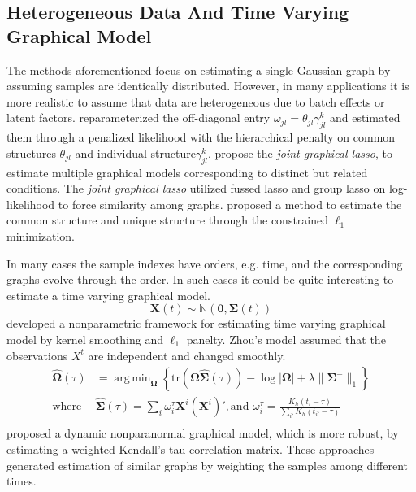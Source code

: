 \documentclass[11pt]{article}
\newcommand{\N}{\mathbb N}
\newcommand{\bX}{\mathbf X}
\newcommand{\bOmega}{{\boldsymbol{\Omega}}}
\newcommand{\bSigma}{{\boldsymbol{\Sigma}}}
\DeclareMathOperator*{\argmin}{arg\,min}
\begin{document}
 
\subsection{Heterogeneous Data And Time Varying Graphical Model}
The methods aforementioned focus on estimating a single Gaussian graph by assuming samples are identically distributed. However, in many applications it is more realistic to assume that data are heterogeneous due to batch effects or latent factors. \cite{guo2011joint} reparameterized the off-diagonal entry $\omega_{jl} = \theta_{jl} \gamma_{jl}^{k}$ and estimated them through a penalized likelihood with the hierarchical penalty on common structures $\theta_{jl}$ and individual structure$\gamma_{jl}^{k}$. \cite{danaher2014joint} propose the \emph{joint graphical lasso}, to estimate multiple graphical models corresponding to distinct but related conditions. The \emph{joint graphical lasso} utilized fussed lasso and group lasso on log-likelihood to force similarity among graphs. \cite{lee2015joint} proposed a method to estimate the common structure and unique structure through the constrained $\ell_1$ minimization.

In many cases the sample indexes have orders, e.g. time, and the corresponding graphs evolve through the order. In such cases it could be quite interesting to estimate a time varying graphical model.
\begin{equation}
	\label{eq:timevarygraph}
	\bX(t) \sim \N(\mathbf{0}, \bSigma(t))
\end{equation}
\cite{zhou2010time} developed a nonparametric framework for estimating time varying graphical model by kernel smoothing and $\ell_1$ panelty. Zhou's model assumed that the observations $X^t$ are independent and changed smoothly. 
\begin{equation}
	\label{eq:kernel_likelihood}
	\begin{aligned}
	\hat{\bOmega}(\tau) &= \argmin_{\bOmega} \left\{ \text{tr}(\bOmega \hat{\bSigma}(\tau)) - \log|\bOmega| + \lambda\|\bSigma^{-}\|_1 \right\}\\
	\text{where }& \hat{\bSigma}(\tau) = \sum_i \omega_i^{\tau} \bX^i (\bX^i)', \text{and }\omega_i^{\tau} = \frac{K_h(t_i - \tau)}{\sum_{i'} K_h(t_{i'}- \tau)} \\
	\end{aligned}
\end{equation}
\cite{lu2015post} proposed a dynamic nonparanormal graphical model, which is more robust, by estimating a weighted Kendall's tau correlation matrix. These approaches generated estimation of similar graphs by weighting the samples among different times.
\end{document}
